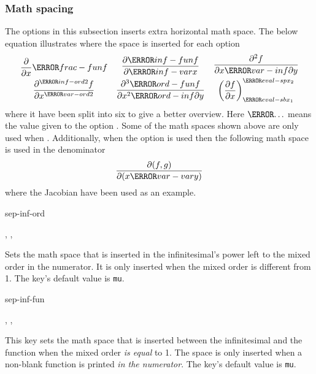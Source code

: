 	\subsubsection*{Math spacing}
	The options in this subsection inserts extra horizontal math space. The below equation illustrates where the space is inserted for each option
	\begin{align*}
		\begin{gathered}
			\frac{ \partial }{ \partial x } \ms{frac-fun} f \\
			\frac{ \partial^{ \ms{inf-ord} 2 } f }{ \partial x^{ \ms{var-ord} 2 } }
		\end{gathered}
		&&
		\begin{gathered}
			\frac{ \partial \ms{inf-fun} f }{ \partial \ms{inf-var} x } \\
			\frac{ \partial^3 \ms{ord-fun} f }{ \partial x^2 \ms{ord-inf} \partial y }
		\end{gathered}
		&&
		\begin{gathered}
			\frac{ \partial^2 f }{ \partial x \ms{var-inf} \partial y }   \\
			\mleft( \frac{ \partial f}{ \partial x } \mright)_{ \ms{eval-sb} x_1}^{ \ms{eval-sp} x_2}
		\end{gathered}
	\end{align*}
	where it have been split into six to give a better overview. Here $\ms{\dots}$ means the value given to the option . Some of the math spaces shown above are only used when . Additionally, when the option  is used then the following math space is used in the denominator
	\begin{equation*}
		\frac{\partial(f, g)}{\partial(x \ms{var-var} y)}
	\end{equation*}
	where the Jacobian have been used as an example.
	
	\begin{option}{sep-inf-ord}
		\begin{values}[default = 0]
			, , 
		\end{values}
		Sets the math space that is inserted in the infinitesimal's power left to the mixed order in the numerator. It is only inserted when the mixed order is different from \num{1}. The key's default value is  \texttt{mu}.
	\end{option}
	
	\begin{option}{sep-inf-fun}
		\begin{values}[default = 0]
			, , 
		\end{values}
		This key sets the math space that is inserted between the infinitesimal and the function when the mixed order \emph{is equal} to \num{1}. The space is only inserted when a non-blank function is printed \emph{in the numerator}. The key's default value is  \texttt{mu}.
	\end{option}
	
